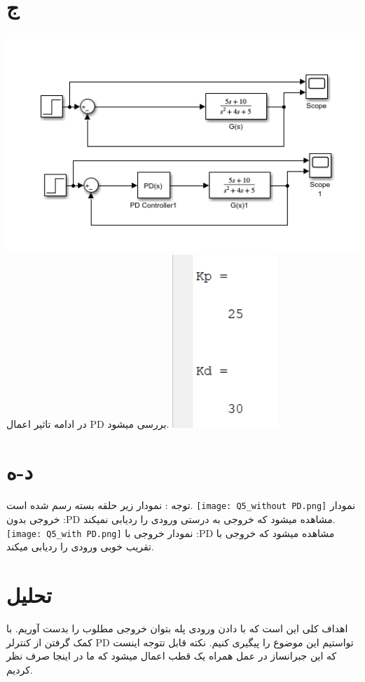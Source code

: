 \documentclass[a4,12pt]{article}
\begin{document}
{          \part{ج}{
         \includegraphics[width=15cm]{Q5.png}
         در ادامه تاثیر اعمال PD بررسی میشود.
         \includegraphics[width=4cm]{Capture2.png}
         }
		    
		\part{د-ه}{
		    توجه : نمودار زیر حلقه بسته رسم شده است.
			\texttt{[image: Q5\_without PD.png]}
			 نمودار خروجی بدون :PD مشاهده میشود که خروجی به درستی ورودی را ردیابی نمیکند.
			\texttt{[image: Q5\_with PD.png]}
			 نمودار خروجی با :PD مشاهده میشود که خروجی با تقریب خوبی ورودی را ردیابی میکند.\\
	\part{تحلیل}{
			 اهداف کلی این است که با دادن ورودی پله بتوان خروجی مطلوب را بدست آوریم. با کمک گرفتن از کنترلر PD تواستیم این موضوع را پیگیری کنیم. نکته قابل تتوجه اینست که این جبرانساز در عمل همراه یک قطب اعمال میشود که ما در اینجا صرف نظر کردیم.
			}
			}
	}
	
\end{document}
